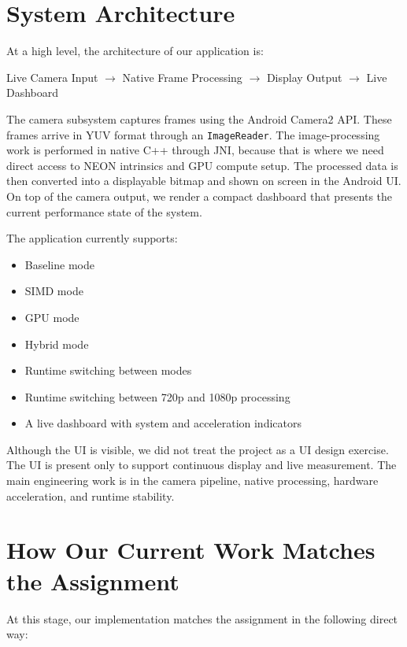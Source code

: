 \documentclass[12pt,a4paper]{article}
\begin{document}
\section{System Architecture}

At a high level, the architecture of our application is:

\begin{center}
Live Camera Input $\rightarrow$ Native Frame Processing $\rightarrow$ Display Output $\rightarrow$ Live Dashboard
\end{center}

The camera subsystem captures frames using the Android Camera2 API. These frames arrive in YUV format through an \texttt{ImageReader}. The image-processing work is performed in native C++ through JNI, because that is where we need direct access to NEON intrinsics and GPU compute setup. The processed data is then converted into a displayable bitmap and shown on screen in the Android UI. On top of the camera output, we render a compact dashboard that presents the current performance state of the system.

The application currently supports:

\begin{itemize}
\item Baseline mode
\item SIMD mode
\item GPU mode
\item Hybrid mode
\item Runtime switching between modes
\item Runtime switching between 720p and 1080p processing
\item A live dashboard with system and acceleration indicators
\end{itemize}

Although the UI is visible, we did not treat the project as a UI design exercise. The UI is present only to support continuous display and live measurement. The main engineering work is in the camera pipeline, native processing, hardware acceleration, and runtime stability.

\section{How Our Current Work Matches the Assignment}

At this stage, our implementation matches the assignment in the following direct way:
\end{document}
